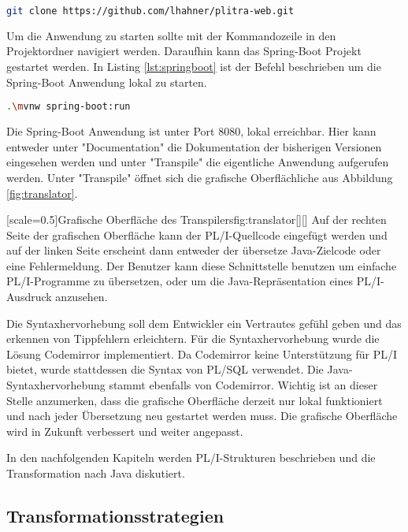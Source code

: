 \begin{lstlisting}[language=bash, caption=Klonen des Repositories der Webschnittstelle, label={lst:gitcloneweb}]
	git clone https://github.com/lhahner/plitra-web.git
\end{lstlisting}

Um die Anwendung zu starten sollte mit der Kommandozeile in den Projektordner navigiert werden.
Daraufhin kann das Spring-Boot Projekt gestartet werden. In Listing \ref{lst:springboot} ist der Befehl beschrieben um die Spring-Boot Anwendung lokal zu starten.

\begin{lstlisting}[language=bash, caption=Build Spring-Boot Projekt, label={lst:springboot}]
	.\mvnw spring-boot:run
\end{lstlisting}

Die Spring-Boot Anwendung ist unter Port 8080, lokal erreichbar.
Hier kann entweder unter "Documentation"  die Dokumentation der bisherigen Versionen eingesehen werden und unter "Transpile"
die eigentliche Anwendung aufgerufen werden.
Unter "Transpile"  öffnet sich die grafische Oberflächliche aus Abbildung \ref{fig:translator}.

[scale=0.5]{Grafische Oberfläche des Transpilers}{fig:translator}[][]
\pagebreak
Auf der rechten Seite der grafischen Oberfläche kann der PL/I-Quellcode eingefügt werden und auf der linken Seite erscheint dann entweder der übersetze Java-Zielcode oder eine Fehlermeldung.
Der Benutzer kann diese Schnittstelle benutzen um einfache PL/I-Programme zu übersetzen, oder um die Java-Repräsentation eines PL/I-Ausdruck anzusehen.

Die Syntaxhervorhebung soll dem Entwickler ein Vertrautes gefühl geben und das erkennen von Tippfehlern erleichtern.
Für die Syntaxhervorhebung wurde die Lösung Codemirror implementiert. Da Codemirror keine Unterstützung für PL/I bietet, wurde stattdessen die Syntax von PL/SQL verwendet. Die Java-Syntaxhervorhebung stammt ebenfalls von Codemirror. Wichtig ist an dieser Stelle anzumerken, dass die grafische Oberfläche derzeit nur lokal funktioniert und nach jeder Übersetzung neu gestartet werden muss. Die grafische Oberfläche wird in Zukunft verbessert und weiter angepasst.

In den nachfolgenden Kapiteln werden PL/I-Strukturen beschrieben und die Transformation nach Java diskutiert.
\pagebreak

\subsection{Transformationsstrategien}
